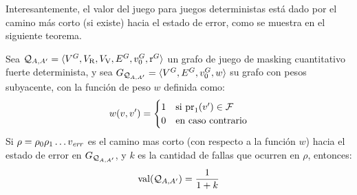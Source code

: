 	Interesantemente, el valor del juego para juegos deterministas está dado por el camino más corto (si existe) hacia el estado de error, como se muestra en el siguiente teorema.
\begin{thm}\label{theorem:det-games} Sea  $\mathcal{Q}_{A, A'} = \langle V^G, V_{\mathrm{R}},V_{\mathrm{V}}, E^G, v_0^G, \operatorname{r}^G \rangle$ un grafo de juego de masking cuantitativo fuerte determinista,
y sea  $G_{\mathcal{Q}_{A, A'}} = \langle V^G,  E^G, v_0^G, w \rangle$ su grafo con pesos subyacente, con la función de peso $w$ 
definida como:
\[
w(v, v') =
\begin{cases} 1 & \text{si $\operatorname{pr}_{1}(v') \in \mathcal{F}$} \\
		      0 & \text{en caso contrario}	 
\end{cases}
\]
	Si $\rho = \rho_0 \rho_1  \dots v_{\mathit{err}}$ es el camino mas corto (con respecto a la función $w$)
hacia el estado de error en $G_{\mathcal{Q}_{A, A'}}$, y $k$ es la cantidad de fallas que ocurren en $\rho$, entonces: 
\[
	\operatorname{val}(\mathcal{Q}_{A, A'}) = \frac{1}{1+k}
\]
\end{thm}
